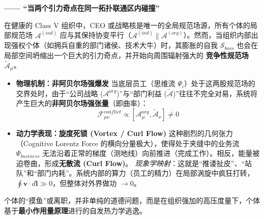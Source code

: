 \textbf{—— “当两个引力奇点在同一拓扑联通区内碰撞”}

在健康的 Class V 组织中，CEO 或战略核是唯一的全局规范场源，所有个体的局部规范场 $\mathcal{A}^{(ind)}$ 应与其保持协变平行（$\mathcal{A}^{(ind)} \parallel \mathcal{A}^{(org)}$）。然而，当组织内部出现强权个体（如拥兵自重的部门诸侯、技术大牛）时，其膨胀的自我 $\mathcal{S}_{boss}$ 也会在局部空间坍缩出一个巨大的引力奇点，并开始向周围辐射强大的 \textbf{竞争性规范场 $\tilde{\mathcal{A}}_\mu$}。

\begin{itemize}
    \item \textbf{物理机制：非阿贝尔场强爆发}
    当底层员工（思维流 $\Psi_i$）处于这两股规范场的交界处时，由于“公司战略 ($\mathcal{A}^{org}$)”与“部门利益 ($\tilde{\mathcal{A}}$)”往往不完全对易，系统将产生巨大的\textbf{非阿贝尔场强张量}（即曲率）：
    $$ \mathcal{F}_{\mu\nu}^{conflict} \propto [\mathcal{A}_\mu^{org}, \tilde{\mathcal{A}}_\nu] \neq 0 $$
    \item \textbf{动力学表现：旋度死锁 (Vortex / Curl Flow)}
    这种剧烈的几何张力（Cognitive Lorentz Force 的横向分量极大），使得处于夹缝中的业务流 $\Psi_{business}$ 无法沿着正常的梯度（测地线）向前推进（完成工作）。相反，能量被迫卷曲，形成\textbf{无散流 (Curl Flow)}。
    \textit{现象学映射}：这就是“推诿扯皮”、“站队”和“部门内耗”。系统内部的算力（员工的精力）在局部涡旋中疯狂打转，$\oint \mathbf{v} \cdot d\mathbf{l} \gg 0$，但整体对外界做功 $\to 0$。
\end{itemize}


个体的“摸鱼”或离职，并非单纯的道德问题，而是在组织强加的高压度量下，个体基于\textbf{最小作用量原理}进行的自发热力学逃逸。

